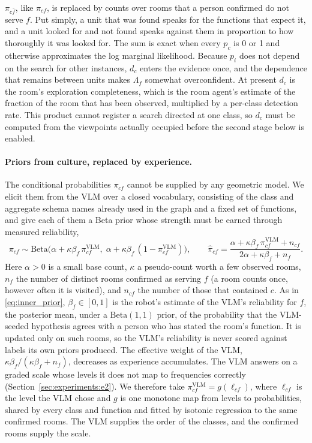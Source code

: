 $\pi_{c\bar f}$, like $\pi_{cf}$, is replaced by counts over rooms that a person confirmed do not serve $f$. Put simply, a unit that was found speaks for the functions that expect it, and a unit looked for and not
found speaks against them in proportion to how thoroughly it was looked for. The sum is exact when every $p_c$ is 0 or 1 and otherwise approximates the log marginal likelihood. Because $p_i$ does not depend on the search for other
instances, $d_c$ enters the evidence once, and the dependence that remains between units makes $\Lambda_f$ somewhat
overconfident. At present $d_c$ is the room's exploration completeness, which is the room
agent's estimate of the fraction of the room that has been observed, multiplied by a per-class detection rate. This
product cannot register a search directed at one class, so $d_c$ must be computed from the viewpoints actually
occupied before the second stage below is enabled.

\paragraph{Priors from culture, replaced by experience.}
The conditional probabilities $\pi_{cf}$ cannot be supplied by any geometric model. We elicit them from the VLM over
a closed vocabulary, consisting of the class and aggregate schema names already used in the graph and a fixed set of functions, and give
each of them a Beta prior whose strength must be earned through measured reliability,
\begin{equation}
    \pi_{cf} \sim \mathrm{Beta}\big(\alpha + \kappa\beta_f\,\pi^{\text{VLM}}_{cf},\;
    \alpha + \kappa\beta_f\,(1-\pi^{\text{VLM}}_{cf})\big),
    \qquad
    \hat\pi_{cf} = \frac{\alpha + \kappa\beta_f\,\pi^{\text{VLM}}_{cf} + n_{cf}}{2\alpha + \kappa\beta_f + n_f}.
    \label{eq:lh_beta_prior}
\end{equation}
Here $\alpha > 0$ is a small base count, $\kappa$ a pseudo-count worth a few observed rooms, $n_f$ the number of
distinct rooms confirmed as serving $f$ (a room counts once, however often it is visited), and $n_{cf}$ the number of
those that contained $c$. As in \eqref{eq:inner_prior}, $\beta_f \in [0,1]$ is the robot's estimate of the VLM's
reliability for $f$, the posterior mean, under a $\mathrm{Beta}(1,1)$ prior, of the probability that the VLM-seeded hypothesis
agrees with a person who has stated the room's function. It is updated only on such rooms, so the VLM's reliability is
never scored against labels its own priors produced. The effective weight of the VLM, $\kappa\beta_f/(\kappa\beta_f +
n_f)$, decreases as experience accumulates.
The VLM answers on a graded scale whose levels it does not map to frequencies correctly
(Section~\ref{sec:experiments:e2}). We therefore take $\pi^{\text{VLM}}_{cf} = g(\ell_{cf})$, where $\ell_{cf}$ is the
level the VLM chose and $g$ is one monotone map from levels to probabilities, shared by every class and function and
fitted by isotonic regression to the same confirmed rooms. The VLM supplies the order of the classes, and the
confirmed rooms supply the scale.

